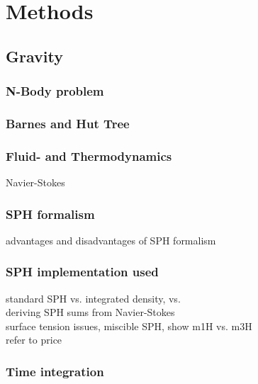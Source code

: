 \graphicspath{{./02figs/}}

\chapter{Methods}
%


\section{Gravity}
\subsection{N-Body problem}

\subsection{Barnes and Hut Tree}


\subsection{Fluid- and Thermodynamics}
Navier-Stokes


\subsection{SPH formalism}
advantages and disadvantages of SPH
formalism





\cite{Abel:2010p3297}
\citep{Barnes:1986p2853}
\citep{Monaghan:2005p2677}
\citep{Ott:2003p3727}
\citep{Price:2004p2613}
\citep{Solenthaler:2008p3720}
\citep{Springel:2003p3298}


\subsection{SPH implementation used}
standard SPH vs. integrated density, vs.\\
deriving SPH sums from Navier-Stokes\\
surface tension issues, miscible SPH, show m1H vs. m3H\\
refer to price\\

\subsection{Time integration}


